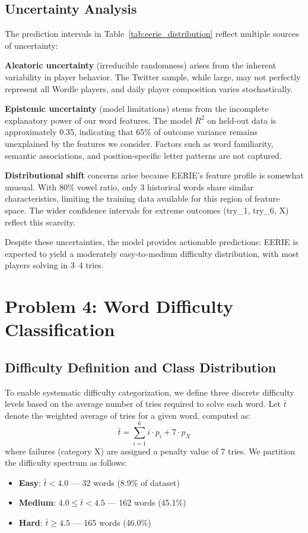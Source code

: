 \documentclass{mcmthesis}
\begin{document}
\subsection{Uncertainty Analysis}

The prediction intervals in Table~\ref{tab:eerie_distribution} reflect multiple sources of uncertainty:

\textbf{Aleatoric uncertainty} (irreducible randomness) arises from the inherent variability in player behavior. The Twitter sample, while large, may not perfectly represent all Wordle players, and daily player composition varies stochastically.

\textbf{Epistemic uncertainty} (model limitations) stems from the incomplete explanatory power of our word features. The model $R^2$ on held-out data is approximately 0.35, indicating that 65\% of outcome variance remains unexplained by the features we consider. Factors such as word familiarity, semantic associations, and position-specific letter patterns are not captured.

\textbf{Distributional shift} concerns arise because EERIE's feature profile is somewhat unusual. With 80\% vowel ratio, only 3 historical words share similar characteristics, limiting the training data available for this region of feature space. The wider confidence intervals for extreme outcomes (try\_1, try\_6, X) reflect this scarcity.

Despite these uncertainties, the model provides actionable predictions: EERIE is expected to yield a moderately easy-to-medium difficulty distribution, with most players solving in 3--4 tries.

\section{Problem 4: Word Difficulty Classification}

\subsection{Difficulty Definition and Class Distribution}

To enable systematic difficulty categorization, we define three discrete difficulty levels based on the average number of tries required to solve each word. Let $\bar{t}$ denote the weighted average of tries for a given word, computed as:
\begin{equation}
\bar{t} = \sum_{i=1}^{6} i \cdot p_i + 7 \cdot p_X
\end{equation}
where failures (category X) are assigned a penalty value of 7 tries. We partition the difficulty spectrum as follows:
\begin{itemize}
\item \textbf{Easy}: $\bar{t} < 4.0$ --- 32 words (8.9\% of dataset)
\item \textbf{Medium}: $4.0 \leq \bar{t} < 4.5$ --- 162 words (45.1\%)
\item \textbf{Hard}: $\bar{t} \geq 4.5$ --- 165 words (46.0\%)
\end{itemize}
\end{document}
